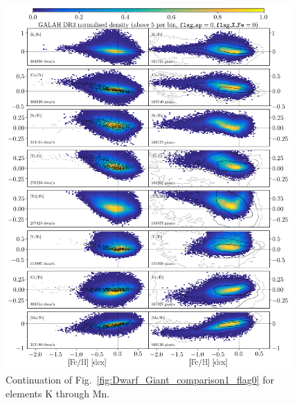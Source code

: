\documentclass[fleqn,usenatbib,useAMS]{mnras}
\begin{document}
\begin{figure}
  \includegraphics[width=0.975\textwidth]{Figures/Dwarf_Giant_comparison2_flag0.png}
\caption{Continuation of Fig.~\ref{fig:Dwarf_Giant_comparison1_flag0} for elements K through Mn.}
  \label{fig:Dwarf_Giant_comparison2_flag0}
\end{figure}
\end{document}

